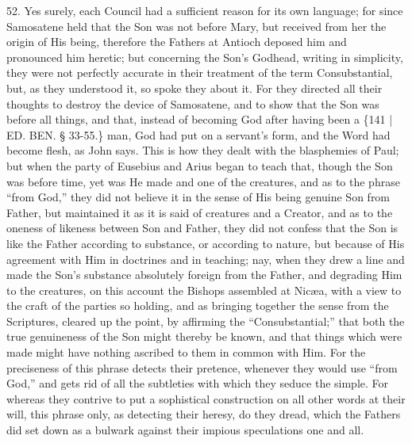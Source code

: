 52. Yes surely, each Council
had a sufficient reason for its own language; for since Samosatene
held that the Son was not before Mary, but received from her the
origin of His being, therefore the Fathers at Antioch deposed him and
pronounced him heretic; but concerning the Son's Godhead, writing in
simplicity, they were not perfectly accurate in their treatment of the
term Consubstantial, but, as they understood it, so spoke they about
it. For they directed all their thoughts to destroy the device of
Samosatene, and to show that the Son was before all things, and that,
instead of becoming God after having been a \{141 | ED.
BEN.
§ 33-55.\} man, God had put on a servant's form, and the Word had
become flesh, as John says. This is how they dealt with the
blasphemies of Paul; but when the party of Eusebius and Arius began to
teach that, though the Son was before time, yet was He made and one of
the creatures, and as to the phrase ``from God,'' they did not believe
it in the sense of His being genuine Son from Father, but maintained
it as it is said of creatures and a Creator, and as to the oneness of
likeness between Son and Father, they did not confess that the Son is
like the Father according to substance, or according to nature, but
because of His agreement with Him in doctrines and in teaching; nay,
when they drew a line and made the Son's substance absolutely foreign
from the Father, and degrading Him to the creatures, on this account
the Bishops assembled at Nicæa, with a view to the craft of the
parties so holding, and as bringing together the sense from the
Scriptures, cleared up the point, by affirming the ``Consubstantial;''
that both the true genuineness of the Son might thereby be known, and
that things which were made might have nothing ascribed to them in
common with Him. For the preciseness of this phrase detects their
pretence, whenever they would use ``from God,'' and gets rid of all the
subtleties with which they seduce the simple. For whereas they
contrive to put a sophistical construction on all other words at their
will, this phrase only, as detecting their heresy, do they dread,
which the Fathers did set down as a bulwark against their impious
speculations one and all.

